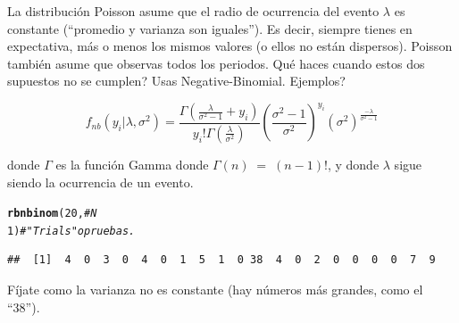 \documentclass[onesided]{article}\usepackage[]{graphicx}\usepackage[]{color}
\makeatletter
\newcommand{\hlnum}[1]{\textcolor[rgb]{0.686,0.059,0.569}{#1}}%
\newcommand{\hlcom}[1]{\textcolor[rgb]{0.678,0.584,0.686}{\textit{#1}}}%
\newcommand{\hlstd}[1]{\textcolor[rgb]{0.345,0.345,0.345}{#1}}%
\newcommand{\hlkwd}[1]{\textcolor[rgb]{0.737,0.353,0.396}{\textbf{#1}}}%
\newenvironment{kframe}{%
 \def\at@end@of@kframe{}%
 \ifinner\ifhmode%
  \def\at@end@of@kframe{\end{minipage}}%
  \begin{minipage}{\columnwidth}%
 \fi\fi%
 \def\FrameCommand##1{\hskip\@totalleftmargin \hskip-\fboxsep
 \colorbox{shadecolor}{##1}\hskip-\fboxsep
     \hskip-\linewidth \hskip-\@totalleftmargin \hskip\columnwidth}%
 \MakeFramed {\advance\hsize-\width
   \@totalleftmargin\z@ \linewidth\hsize
   \@setminipage}}%
 {\par\unskip\endMakeFramed%
 \at@end@of@kframe}
\newenvironment{knitrout}{}{} %
\makeatother
\begin{document}
La distribuci\'on Poisson asume que el radio de ocurrencia del evento $\lambda$ es constante (``promedio y varianza son iguales''). Es decir, siempre tienes en expectativa, m\'as o menos los mismos valores (o ellos no est\'an dispersos). Poisson tambi\'en asume que observas todos los periodos. Qu\'e haces cuando estos dos supuestos no se cumplen? Usas Negative-Binomial. {\color{red}Ejemplos}? %

\begin{equation}\label{Neg.Bin}
f_{nb}(y_{i}|\lambda,\sigma^{2})  =	\frac{\Gamma(\frac{\lambda}{\sigma^{2}-1}+y_{i})}{y_{i}!\Gamma (\frac{\lambda}{\sigma^{2}})} (\frac{\sigma^{2}-1}{\sigma^{2}})^{y_{i}}(\sigma^{2})^{\frac{-\lambda}{\sigma^{2}-1}}
\end{equation}

donde $\Gamma$ es la funci\'on Gamma donde $\Gamma(n) \;=\; (n-1)!$, y donde $\lambda$ sigue siendo la ocurrencia de un evento.


\begin{knitrout}
\color{fgcolor}\begin{kframe}
\begin{alltt}
\hlkwd{rbnbinom}\hlstd{(}\hlnum{20}\hlstd{,} \hlcom{# N}
\hlnum{1}\hlstd{)} \hlcom{# "Trials" o pruebas.}
\end{alltt}
\begin{verbatim}
##  [1]  4  0  3  0  4  0  1  5  1  0 38  4  0  2  0  0  0  0  7  9
\end{verbatim}
\end{kframe}
\end{knitrout}

F\'ijate como la varianza no es constante (hay n\'umeros m\'as grandes, como el ``38'').
\end{document}
